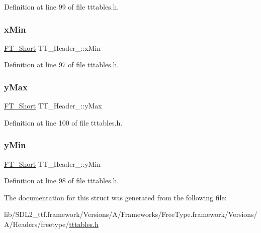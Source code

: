 Definition at line 99 of file tttables.\+h.

\mbox{\label{struct_t_t___header___ae4553d76427d9f7a28595ed71897dcbb}} 
\subsubsection{\texorpdfstring{xMin}{xMin}}
{\footnotesize\ttfamily \mbox{\hyperlink{fttypes_8h_aa7279be89046a2563cd3d4d6651fbdcf}{F\+T\+\_\+\+Short}} T\+T\+\_\+\+Header\+\_\+\+::x\+Min}



Definition at line 97 of file tttables.\+h.

\mbox{\label{struct_t_t___header___a02d236cd8150c00e886a0c487c04dffa}} 
\subsubsection{\texorpdfstring{yMax}{yMax}}
{\footnotesize\ttfamily \mbox{\hyperlink{fttypes_8h_aa7279be89046a2563cd3d4d6651fbdcf}{F\+T\+\_\+\+Short}} T\+T\+\_\+\+Header\+\_\+\+::y\+Max}



Definition at line 100 of file tttables.\+h.

\mbox{\label{struct_t_t___header___ac6aad4966bac8a96c5bc48765b3d694a}} 
\subsubsection{\texorpdfstring{yMin}{yMin}}
{\footnotesize\ttfamily \mbox{\hyperlink{fttypes_8h_aa7279be89046a2563cd3d4d6651fbdcf}{F\+T\+\_\+\+Short}} T\+T\+\_\+\+Header\+\_\+\+::y\+Min}



Definition at line 98 of file tttables.\+h.



The documentation for this struct was generated from the following file\+:\begin{DoxyCompactItemize}
\item 
lib/\+S\+D\+L2\+\_\+ttf.\+framework/\+Versions/\+A/\+Frameworks/\+Free\+Type.\+framework/\+Versions/\+A/\+Headers/freetype/\mbox{\hyperlink{tttables_8h}{tttables.\+h}}\end{DoxyCompactItemize}
